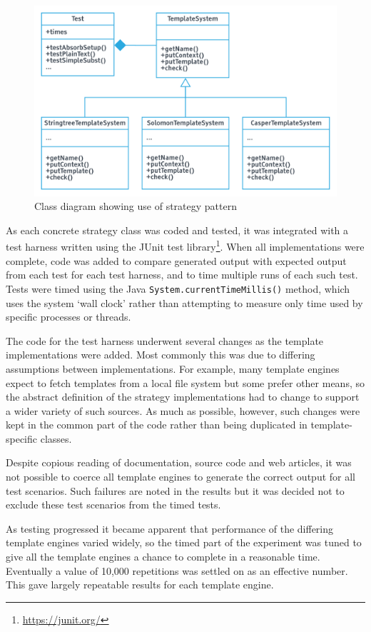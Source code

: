 \begin{figure}[ht!]
\centering
\includegraphics[width=130mm]{Figures/classes.png}
\caption{Class diagram showing use of strategy pattern}
\label{fs:figure:strategy}
\end{figure}

As each concrete strategy class was coded and tested, it was integrated with a test harness written using the JUnit test library\footnote{\url{https://junit.org/}}. When all implementations were complete, code was added to compare generated output with expected output from each test for each test harness, and to time multiple runs of each such test. Tests were timed using the Java \texttt{System.currentTimeMillis()} method, which uses the system `wall clock' rather than attempting to measure only time used by specific processes or threads.

The code for the test harness underwent several changes as the template implementations were added. Most commonly this was due to differing assumptions between implementations. For example, many template engines expect to fetch templates from a local file system but some prefer other means, so the abstract definition of the strategy implementations had to change to support a wider variety of such sources. As much as possible, however, such changes were kept in the common part of the code rather than being duplicated in template-specific classes.

Despite copious reading of documentation, source code and web articles, it was not possible to coerce all template engines to generate the correct output for all test scenarios. Such failures are noted in the results but it was decided not to exclude these test scenarios from the timed tests.

As testing progressed it became apparent that performance of the differing template engines varied widely, so the timed part of the experiment was tuned to give all the template engines a chance to complete in a reasonable time. Eventually a value of 10,000 repetitions was settled on as an effective number. This gave largely repeatable results for each template engine.

